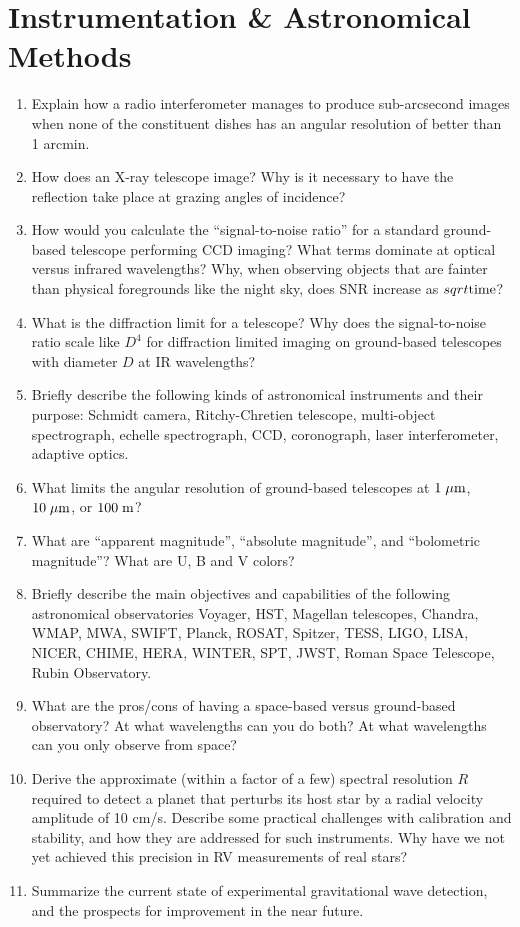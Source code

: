 \documentclass[11pt, oneside]{book}
\begin{document}
\section{Instrumentation \& Astronomical Methods}

\begin{enumerate}[start=153, itemsep=0.4cm]
    \item Explain how a radio interferometer manages to produce sub-arcsecond images when none of the constituent dishes has an angular resolution of better than 1 arcmin.
    \item How does an X-ray telescope image? Why is it necessary to have the reflection take place at grazing angles of incidence?
    \item How would you calculate the ``signal-to-noise ratio'' for a standard ground-based telescope performing CCD imaging? What terms dominate at optical versus infrared wavelengths? Why, when observing objects that are fainter than physical foregrounds like the night sky, does SNR increase as $sqrt{\rm time}$?
    \item What is the diffraction limit for a telescope? Why does the signal-to-noise ratio scale like $D^{4}$ for diffraction limited imaging on ground-based telescopes with diameter $D$ at IR wavelengths?
    \item Briefly describe the following kinds of astronomical instruments and their purpose: Schmidt camera, Ritchy-Chretien telescope, multi-object spectrograph, echelle spectrograph, CCD, coronograph, laser interferometer, adaptive optics.
    \item What limits the angular resolution of ground-based telescopes at $1 \; {\rm \mu m}$, $10 \; {\rm \mu m}$, or $100 \; {\rm m}$?
    \item What are ``apparent magnitude'', ``absolute magnitude'', and ``bolometric magnitude''? What are U, B and V colors?
    \item Briefly describe the main objectives and capabilities of the following astronomical observatories Voyager, HST, Magellan telescopes, Chandra, WMAP, MWA, SWIFT, Planck, ROSAT, Spitzer, TESS, LIGO, LISA, NICER, CHIME, HERA, WINTER, SPT, JWST, Roman Space Telescope, Rubin Observatory.
    \item What are the pros/cons of having a space-based versus ground-based observatory? At what wavelengths can you do both? At what wavelengths can you only observe from space?
    \item Derive the approximate (within a factor of a few) spectral resolution $R$ required to detect a planet that perturbs its host star by a radial velocity amplitude of 10 cm/s. Describe some practical challenges with calibration and stability, and how they are addressed for such instruments. Why have we not yet achieved this precision in RV measurements of real stars?
    \item Summarize the current state of experimental gravitational wave detection, and the prospects for improvement in the near future.
\end{enumerate}
\end{document}
